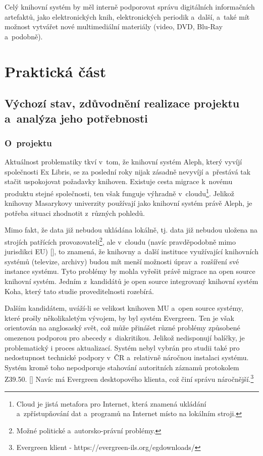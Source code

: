 \documentclass[
	11pt, oneside, printed, final, palatino, monochrome
	microtype,
	table,   %
	lof,     %
	lot     %
]{fithesis3}
\newcommand{\citepages}[2]{[\cite[#1]{#2}]}
\begin{document}
{Celý knihovní systém by měl interně podporovat správu digitálních informačních artefaktů, jako  elektronických knih, elektronických periodik a~další, a~také mít možnost vytvářet nové multimediální materiály (video, DVD, Blu-Ray a~podobně).

\chapter{Praktická část}

\section{Výchozí stav, zdůvodnění realizace projektu a~analýza jeho potřebnosti}

\subsection{O~projektu}

Aktuálnost problematiky tkví v~tom, že knihovní systém Aleph, který vyvíjí společnosti Ex Libris, se za poslední roky nijak zásadně nevyvíjí a~přestává tak stačit uspokojovat požadavky knihoven. Existuje cesta migrace k~novému produktu stejné společnosti, ten však funguje výhradně v~cloudu\footnote{Cloud je jistá metafora pro Internet, která znamená ukládání a~zpřístupňování dat a~programů na Internet místo na lokálním stroji.}. Jelikož knihovny Masarykovy univerzity používají jako knihovní systém právě Aleph, je potřeba situaci zhodnotit z~různých pohledů.

Mimo fakt, že data již nebudou ukládána lokálně, tj. data již nebudou uložena na strojích patřících provozovateli\footnote{Možné politické a~autorsko-právní problémy.}, ale v~cloudu (navíc pravděpodobně mimo jurisdikci EU) \citepages{16-17}{breeding_2012}, to znamená, že knihovny a~další instituce využívající knihovních systémů (televize, archivy) budou mít menší možnosti úprav a~rozšíření své instance systému. Tyto problémy by mohla vyřešit právě migrace na open source knihovní systém. Jedním z~kandidátů je open source integrovaný knihovní systém Koha, který tato studie proveditelnosti rozebírá. 

Dalším kandidátem, uváží-li se velikost knihoven MU a~open source systémy, které prošly několikaletým vývojem, by byl systém Evergreen. Ten je však orientován na anglosaský svět, což může přinášet různé problémy způsobené omezenou podporou pro abecedy s~diakritikou. Jelikož nedisponují balíčky, je problematický i proces aktualizací. 
 Systém nebyl vybrán pro studii také pro nedostupnost technické podpory v~ČR a~relativně náročnou instalaci %
  systému. Systém kromě toho nepodporuje stahování autoritních záznamů protokolem Z39.50. \citepages{10-14}{denar_2015}
 Navíc má Evergreen desktopového klienta, což činí správu náročnější.\footnote{Evergreen klient - https://evergreen-ils.org/egdownloads/}
 
}
\end{document}
